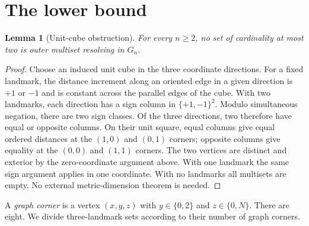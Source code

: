 \documentclass[11pt,a4paper]{article}
\newtheorem{lemma}{Lemma}
\begin{document}
\section{The lower bound}
\setcounter{lemma}{-1}
\begin{lemma}[Unit-cube obstruction]\label{lem:small}
For every $n\ge2$, no set of cardinality at most two is outer multiset resolving in $G_n$.
\end{lemma}
\begin{proof}
Choose an induced unit cube in the three coordinate directions. For a fixed landmark, the distance increment along an oriented edge in a given direction is $+1$ or $-1$ and is constant across the parallel edges of the cube. With two landmarks, each direction has a sign column in $\{+1,-1\}^2$. Modulo simultaneous negation, there are two sign classes. Of the three directions, two therefore have equal or opposite columns. On their unit square, equal columns give equal ordered distances at the $(1,0)$ and $(0,1)$ corners; opposite columns give equality at the $(0,0)$ and $(1,1)$ corners. The two vertices are distinct and exterior by the zero-coordinate argument above. With one landmark the same sign argument applies in one coordinate. With no landmarks all multisets are empty. No external metric-dimension theorem is needed.
\end{proof}

A \emph{graph corner} is a vertex $(x,y,z)$ with $y\in\{0,2\}$ and $z\in\{0,N\}$. There are eight. We divide three-landmark sets according to their number of graph corners.
\end{document}
